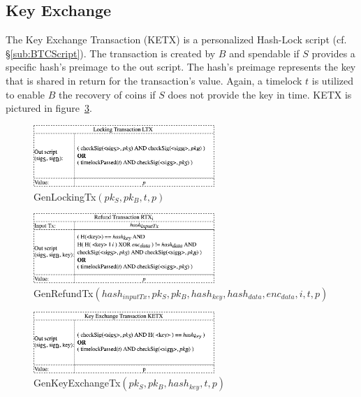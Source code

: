 \documentclass{cacthesis}
\begin{document}
        \subsection{Key Exchange}
        \label{sub:KeyExchangeTx}
        The Key Exchange Transaction (KETX) is a personalized Hash-Lock script (cf. §\ref{sub:BTCScript}). The transaction is created by $B$ and spendable if $S$ provides a specific hash's preimage to the out script. The hash's preimage represents the key that is shared in return for the transaction's value. Again, a timelock $t$ is utilized to enable $B$ the recovery of coins if $S$ does not provide the key in time. KETX is pictured in \mbox{figure \ref{fig:genKeyExchangeTx}}.
        
        \begin{figure}
            \begin{center}
              \includegraphics[width=0.61\textwidth]{images/GenLockingTx.png}
              \caption{\textsf{GenLockingTx}$(pk_S, pk_B, t, p)$}
              \label{fig:genLockingTx}
            \end{center}
        \end{figure}
        
        \begin{figure}
            \begin{center}
              \includegraphics[width=0.61\textwidth]{images/GenRefundTx.png}
              \caption{\textsf{GenRefundTx}$(hash_{inputTx}, pk_S, pk_B, hash_{key}, hash_{data}, enc_{data}, i, t, p)$}
              \label{fig:genRefundTx}
            \end{center}
        \end{figure}
        
        \begin{figure}
            \begin{center}
              \includegraphics[width=0.61\textwidth]{images/GenKeyExchangeTx.png}
              \caption{\textsf{GenKeyExchangeTx}$(pk_S, pk_B, hash_{key}, t, p)$}
              \label{fig:genKeyExchangeTx}
            \end{center}
        \end{figure}
        
\end{document}
